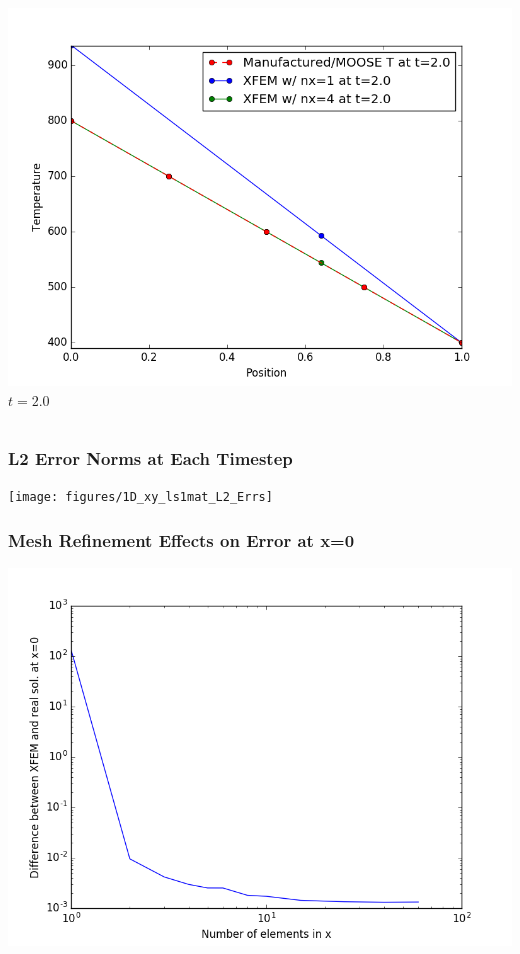 \documentclass[]{beamer}
\begin{document}
\begin{frame}[t]
\begin{columns}
\begin{center}
			\includegraphics[scale=0.17]{figures/1D_xy_ls1mat_u_vs_x_20}\\
			$t=2.0$
			\end{center}
	\end{columns}
\end{frame}

\begin{frame}[t]\frametitle{L2 Error Norms at Each Timestep}
	\begin{center}
		\texttt{[image: figures/1D\_xy\_ls1mat\_L2\_Errs]}
	\end{center}
\end{frame}

\begin{frame}[t]\frametitle{Mesh Refinement Effects on Error at x=0}
	\begin{center}
		\includegraphics[scale=0.4]{figures/1D_xy_ls1mat_neumann_comp}
	\end{center}
\end{frame}
\end{document}
